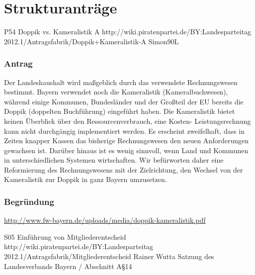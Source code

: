 \documentclass[12pt,a4paper,oneside]{scrbook}
\begin{document}




\clearpage






\chapter{Strukturanträge}\label{Strukturantraege} %









\positionspapier
{P54}
{Doppik vs. Kameralistik A}
{http://wiki.piratenpartei.de/BY:Landesparteitag 2012.1/Antragsfabrik/Doppik+Kameralistik-A}
{Simon90L}
\subsection{Antrag}
Der Landeshaushalt wird maßgeblich durch das
verwendete Rechnungswesen bestimmt. Bayern verwendet noch die Kameralistik
(Kameralbuchwesen), während einige Kommunen, Bundesländer und der Großteil der EU bereits
die Doppik (doppelten Buchführung) eingeführt haben. Die Kameralistik bietet keinen Überblick
über den Ressourcenverbrauch, eine Kosten- Leistungsrechnung kann nicht durchgängig
implementiert werden. Es erscheint zweifelhaft, dass in Zeiten knapper Kassen das bisherige
Rechnungswesen den neuen Anforderungen gewachsen ist. Darüber hinaus ist es wenig sinnvoll,
wenn Land und Kommunen in unterschiedlichen Systemen wirtschaften. Wir befürworten daher
eine Reformierung des Rechnungswesens mit der Zielrichtung, den Wechsel von der Kameralistik
zur Doppik in ganz Bayern umzusetzen.
\subsection{Begründung}
\url{http://www.fw-bayern.de/uploads/media/doppik-kameralistik.pdf}

\anderungsantrag
{S05}
{Einführung von Mitgliederentscheid}
{http://wiki.piratenpartei.de/BY:Landesparteitag 2012.1/Antragsfabrik/Mitgliederentscheid}
{Rainer Wutta}
{Satzung des Landesverbands Bayern / Abschnitt A§14}
\end{document}
